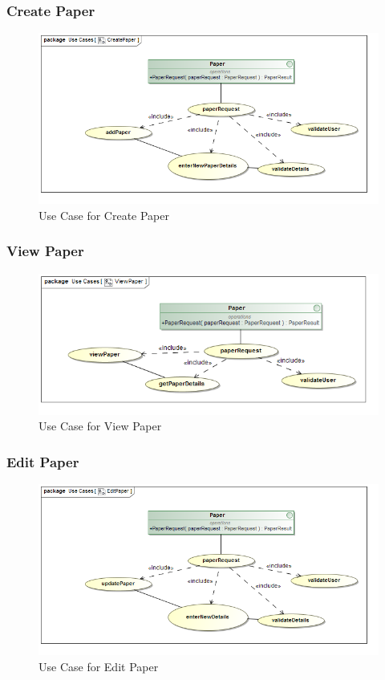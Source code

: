 \documentclass[a4paper,10pt]{article}
\begin{document}
\subsubsection{Create Paper}
	\begin{figure}[h]
		\includegraphics[scale=0.5]{Use_CreatePaper}
	\caption{Use Case for Create Paper}
	\end{figure}


\subsubsection{View Paper}
	\begin{figure}[h]
		\includegraphics[scale=0.5]{Use_ViewPaper}
	\caption{Use Case for View Paper}
	\end{figure}

\subsubsection{Edit Paper}
	\begin{figure}[h]
		\includegraphics[scale=0.5]{Use_EditPaper}
	\caption{Use Case for Edit Paper}
	\end{figure}
\end{document}
